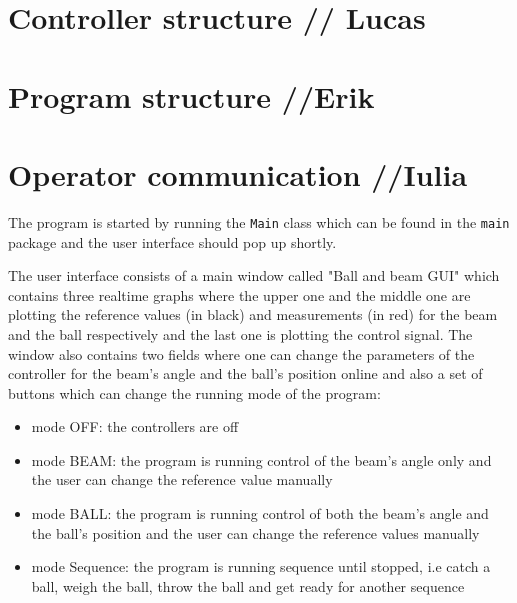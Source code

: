 \documentclass{article}
\begin{document}
\section{Controller structure // Lucas} \label{sec:controller_structure}


\section{Program structure //Erik}



\section{Operator communication //Iulia}\label{OpCom}
The program is started by running the \texttt{Main} class which can be found in the \texttt{main} package and the user interface should pop up shortly.

The user interface consists of a main window called "Ball and beam GUI" which contains three realtime graphs where the upper one and the middle one are plotting the reference values (in black) and measurements (in red) for the beam and the ball respectively and the last one is plotting the control signal. The window also contains two fields where one can change the parameters of the controller for the beam's angle and the ball's position online and also a set of buttons which can change the running mode of the program:
\begin{itemize}
\item mode OFF: the controllers are off
\item mode BEAM: the program is running control of the beam's angle only and the user can change the reference value manually
\item mode BALL: the program is running control of both the beam's angle and the ball's position and the user can change the reference values manually
\item mode Sequence: the program is running sequence until stopped, i.e catch a ball, weigh the ball, throw the ball and get ready for another sequence
\end{itemize}
\end{document}
